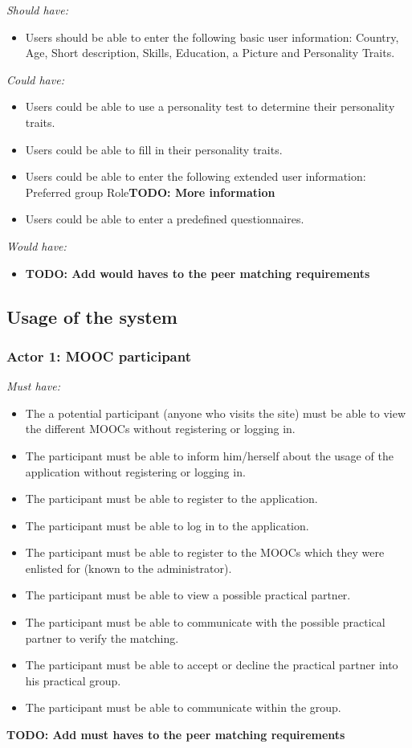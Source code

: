 \documentclass[]{article}
\newcommand{\TODO}[1]{{\color{red}\textbf{TODO: #1}}}
\newcommand{\reqr}[1]{{\noindent\emph{#1:}}}
\begin{document}
\reqr{Should have}
\begin{itemize}
\item Users should be able to enter the following basic user information: Country, Age, Short description, Skills, Education, a Picture and Personality Traits.
\end{itemize}

\reqr{Could have}
\begin{itemize}
\item Users could be able to use a personality test to determine their personality traits.
\item Users could be able to fill in their personality traits.
\item Users could be able to enter the following extended user information: Preferred group Role\TODO{More information}
\item Users could be able to enter a predefined questionnaires.
\end{itemize}

\reqr{Would have}
\begin{itemize}
\item \TODO{Add would haves to the peer matching requirements}
\end{itemize}

\subsection{Usage of the system}

\subsubsection{Actor 1: MOOC participant}

\reqr{Must have}
\begin{itemize}
\item The a potential participant (anyone who visits the site) must be able to view the different MOOCs without registering or logging in.
\item The participant must be able to inform him/herself about the usage of the application without registering or logging in.
\item The participant must be able to register to the application.
\item The participant must be able to log in to the application.
\item The participant must be able to register to the MOOCs which they were enlisted for (known to the administrator).
\item The participant must be able to view a possible practical partner.
\item The participant must be able to communicate with the possible practical partner to verify the matching.
\item The participant must be able to accept or decline the practical partner into his practical group.
\item The participant must be able to communicate within the group.
\end{itemize}
\TODO{Add must haves to the peer matching requirements}
\end{document}
